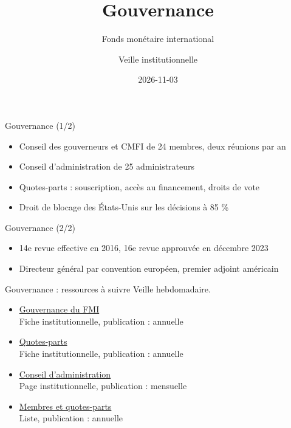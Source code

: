 \documentclass[aspectratio=169,11pt]{beamer}
\title{Gouvernance}
\subtitle{Fonds monétaire international}
\author{Veille institutionnelle}
\date{2026-11-03}
\begin{document}
\begin{frame}\titlepage\end{frame}

\begin{frame}{Gouvernance (1/2)}
\begin{itemize}
\item Conseil des gouverneurs et CMFI de 24 membres, deux réunions par an
\item Conseil d'administration de 25 administrateurs
\item Quotes-parts : souscription, accès au financement, droits de vote
\item Droit de blocage des États-Unis sur les décisions à 85 \%
\end{itemize}
\end{frame}

\begin{frame}{Gouvernance (2/2)}
\begin{itemize}
\item 14e revue effective en 2016, 16e revue approuvée en décembre 2023
\item Directeur général par convention européen, premier adjoint américain
\end{itemize}
\end{frame}

\begin{frame}{Gouvernance : ressources à suivre}
\small
Veille hebdomadaire.
\begin{itemize}
\item \href{https://www.imf.org/en/About/Factsheets/Sheets/2016/07/14/12/21/Governance-Structure}{Gouvernance du FMI}\\{\footnotesize Fiche institutionnelle, publication : annuelle}
\item \href{https://www.imf.org/en/About/Factsheets/Sheets/2016/07/14/12/21/IMF-Quotas}{Quotes-parts}\\{\footnotesize Fiche institutionnelle, publication : annuelle}
\item \href{https://www.imf.org/en/About/Executive-Board}{Conseil d'administration}\\{\footnotesize Page institutionnelle, publication : mensuelle}
\item \href{https://www.imf.org/external/np/sec/memdir/members.aspx}{Membres et quotes-parts}\\{\footnotesize Liste, publication : annuelle}
\end{itemize}
\end{frame}
\end{document}
